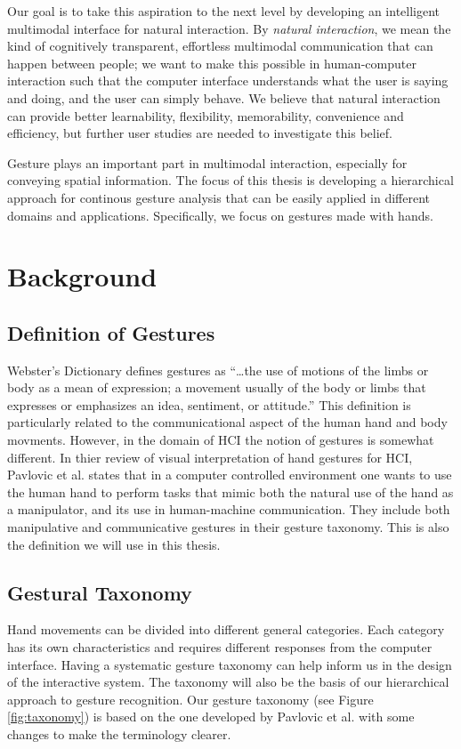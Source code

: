Our goal is to take this aspiration to the next level by developing an
intelligent multimodal interface for natural interaction. By \textit{natural
interaction}, we mean the kind of cognitively transparent, effortless multimodal
communication that can happen between people; we want to make this possible in
human-computer interaction such that the computer interface understands what the
user is saying and doing, and the user can simply behave. We believe that
natural interaction can provide better learnability, flexibility, memorability,
convenience and efficiency, but further user studies are needed to investigate
this belief.

Gesture plays an important part in multimodal interaction, especially for
conveying spatial information. The focus of this thesis is developing a
hierarchical approach for continous gesture analysis that can be easily
applied in different domains and applications. Specifically, we focus on
gestures made with hands.

\section{Background}

\subsection{Definition of Gestures}
Webster's Dictionary defines gestures as ``\ldots the use of motions of the
limbs or body as a mean of expression; a movement usually of the body or limbs
that expresses or emphasizes an idea, sentiment, or attitude.'' This definition
is particularly related to the communicational aspect of the human hand and body
movments. However, in the domain of HCI the notion of gestures is somewhat
different. In thier review of visual interpretation of hand
gestures for HCI, Pavlovic et al. \cite{Pavlovic97} states that in a computer
controlled environment one wants to use the human hand to perform tasks that
mimic both the natural use of the hand as a manipulator, and its use in
human-machine communication. They include both manipulative and communicative
gestures in their gesture taxonomy. This is also the definition we will use in
this thesis.

\subsection{Gestural Taxonomy}\label{sec:taxonomy}
Hand movements can be divided into different general categories. Each
category has its own characteristics and requires different responses from
the computer interface. Having a systematic gesture taxonomy can help inform
us in the design of the interactive system. The taxonomy will also be the basis
of our hierarchical approach to gesture recognition. Our gesture taxonomy (see
Figure \ref{fig:taxonomy}) is based on the one developed by Pavlovic et al.
\cite{Pavlovic97} with some changes to make the terminology clearer.

